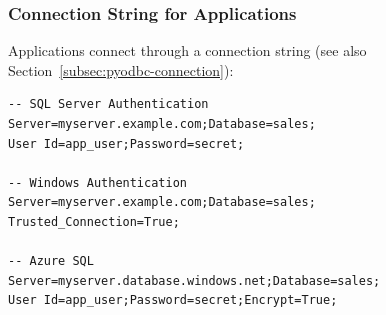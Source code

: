 \subsubsection{Connection String for Applications}
\label{subsec:connection-strings}

Applications connect through a connection string (see also Section~\ref{subsec:pyodbc-connection}):

\begin{lstlisting}[language={}, basicstyle=\ttfamily\scriptsize]
-- SQL Server Authentication
Server=myserver.example.com;Database=sales;
User Id=app_user;Password=secret;

-- Windows Authentication
Server=myserver.example.com;Database=sales;
Trusted_Connection=True;

-- Azure SQL
Server=myserver.database.windows.net;Database=sales;
User Id=app_user;Password=secret;Encrypt=True;
\end{lstlisting}
